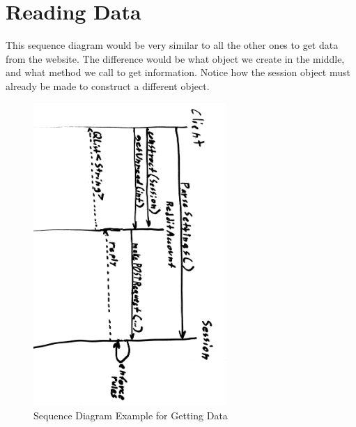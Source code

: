 \documentclass[12pt]{article}
\begin{document}
\clearpage
\section{Reading Data}
This sequence diagram would be very similar to all the other ones to get data from the website.
The difference would be what object we create in the middle, and what method we call to get information.
Notice how the session object must already be made to construct a different object.
\begin{figure}[ht]
	\centering
	\caption{Sequence Diagram Example for Getting Data}
	\label{sequence}
	\includegraphics[width=0.65\textwidth]{sequence.png}
\end{figure}
\end{document}
